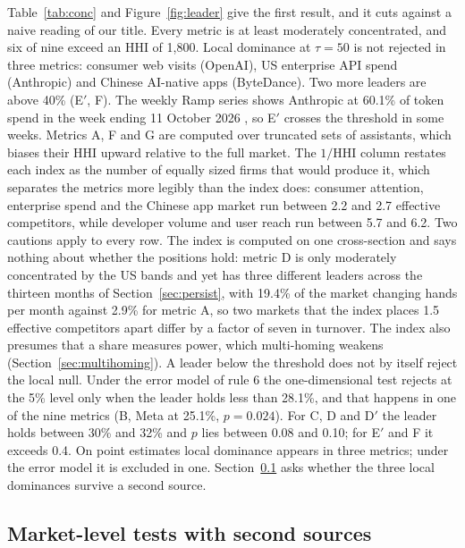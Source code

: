 \documentclass[11pt]{article}
\begin{document}
Table~\ref{tab:conc} and Figure~\ref{fig:leader} give the first result, and it cuts against a naive reading of our title. Every metric is at least moderately concentrated, and six of nine exceed an HHI of 1{,}800. Local dominance at $\tau=50$ is not rejected in three metrics: consumer web visits (OpenAI), US enterprise API spend (Anthropic) and Chinese AI-native apps (ByteDance). Two more leaders are above 40\% (E$'$, F). The weekly Ramp series shows Anthropic at 60.1\% of token spend in the week ending 11 October 2026 \cite{ramp2026index}, so E$'$ crosses the threshold in some weeks. Metrics A, F and G are computed over truncated sets of assistants, which biases their HHI upward relative to the full market. The $1/\mathrm{HHI}$ column restates each index as the number of equally sized firms that would produce it, which separates the metrics more legibly than the index does: consumer attention, enterprise spend and the Chinese app market run between 2.2 and 2.7 effective competitors, while developer volume and user reach run between 5.7 and 6.2. Two cautions apply to every row. The index is computed on one cross-section and says nothing about whether the positions hold: metric D is only moderately concentrated by the US bands and yet has three different leaders across the thirteen months of Section~\ref{sec:persist}, with 19.4\% of the market changing hands per month against 2.9\% for metric A, so two markets that the index places 1.5 effective competitors apart differ by a factor of seven in turnover. The index also presumes that a share measures power, which multi-homing weakens (Section~\ref{sec:multihoming}). A leader below the threshold does not by itself reject the local null. Under the error model of rule 6 the one-dimensional test rejects at the 5\% level only when the leader holds less than 28.1\%, and that happens in one of the nine metrics (B, Meta at 25.1\%, $p=0.024$). For C, D and D$'$ the leader holds between 30\% and 32\% and $p$ lies between 0.08 and 0.10; for E$'$ and F it exceeds 0.4. On point estimates local dominance appears in three metrics; under the error model it is excluded in one. Section~\ref{sec:markets} asks whether the three local dominances survive a second source.

\subsection{Market-level tests with second sources}
\label{sec:markets}
\end{document}
